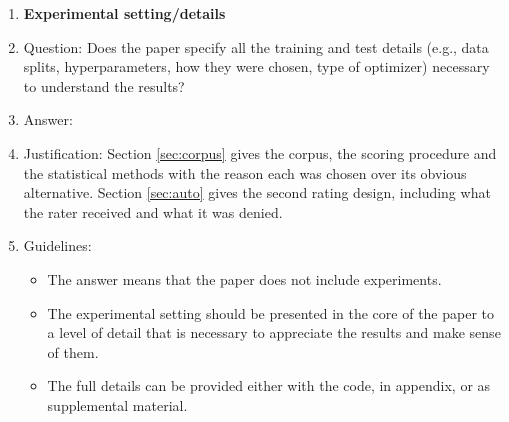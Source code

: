 \documentclass{article}
\begin{document}
\begin{enumerate}
\item {\bf Experimental setting/details}
    \item[] Question: Does the paper specify all the training and test details (e.g., data splits, hyperparameters, how they were chosen, type of optimizer) necessary to understand the results?
    \item[] Answer: \answerYes{}
    \item[] Justification: Section \ref{sec:corpus} gives the corpus, the scoring procedure and the statistical methods with the reason each was chosen over its obvious alternative. Section \ref{sec:auto} gives the second rating design, including what the rater received and what it was denied.
    \item[] Guidelines:
    \begin{itemize}
        \item The answer \answerNA{} means that the paper does not include experiments.
        \item The experimental setting should be presented in the core of the paper to a level of detail that is necessary to appreciate the results and make sense of them.
        \item The full details can be provided either with the code, in appendix, or as supplemental material.
    \end{itemize}


\end{enumerate}
\end{document}
